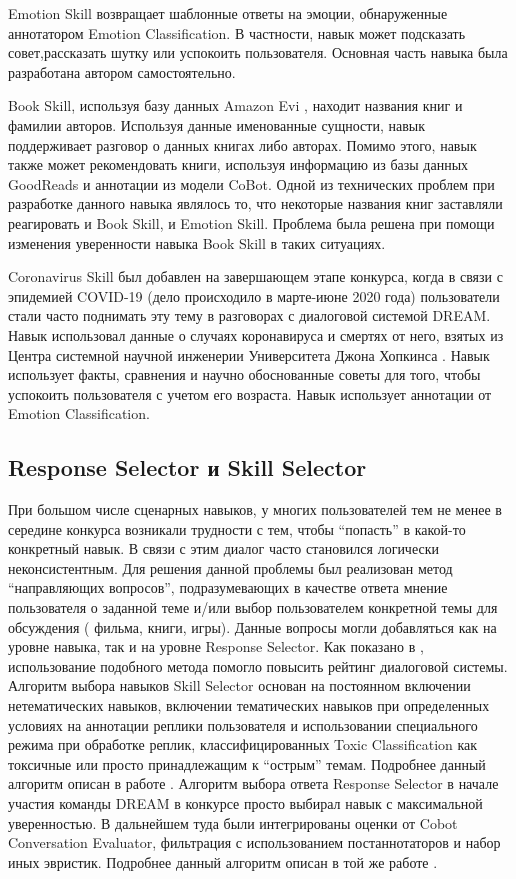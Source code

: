 Emotion Skill возвращает шаблонные ответы на эмоции, обнаруженные аннотатором Emotion Classification. В частности, навык может подсказать совет,рассказать шутку или успокоить пользователя. Основная часть навыка была разработана автором самостоятельно.

Book Skill, используя базу данных Amazon Evi \cite{na_website_nds}, находит названия книг и фамилии авторов. Используя данные именованные сущности, навык поддерживает разговор о данных книгах либо авторах. Помимо этого, навык также может рекомендовать книги, используя информацию из базы данных GoodReads \cite{na_website_ndt} и аннотации из модели CoBot. Одной из технических проблем при разработке данного навыка являлось то, что некоторые названия книг заставляли реагировать и Book Skill, и Emotion Skill. Проблема была решена при помощи изменения уверенности навыка Book Skill в таких ситуациях.

Coronavirus Skill был добавлен на завершающем этапе конкурса, когда в связи с эпидемией COVID-19 (дело происходило в марте-июне 2020 года) пользователи стали часто поднимать эту тему в разговорах с диалоговой системой DREAM. Навык использовал данные о случаях коронавируса и смертях от него, взятых из Центра системной научной инженерии Университета Джона Хопкинса \cite{na_website_ndr}. Навык использует факты, сравнения и научно обоснованные советы для того, чтобы успокоить пользователя с учетом его возраста. Навык использует аннотации от Emotion Classification.

\subsection{Response Selector и Skill Selector}

При большом числе сценарных навыков, у многих пользователей тем не менее в середине конкурса возникали трудности с тем, чтобы “попасть” в какой-то конкретный навык. В связи с этим диалог часто становился логически неконсистентным. Для решения данной проблемы был реализован метод “направляющих вопросов”, подразумевающих в качестве ответа мнение пользователя о заданной теме и/или выбор пользователем конкретной темы для обсуждения ( фильма, книги, игры). Данные вопросы могли добавляться как на уровне навыка, так и на уровне Response Selector. Как показано в \cite{dream1}, использование подобного метода помогло повысить рейтинг диалоговой системы.
Алгоритм выбора навыков Skill Selector основан на постоянном включении нетематических навыков, включении тематических навыков при определенных условиях на аннотации реплики пользователя и использовании специального режима при обработке реплик, классифицированных Toxic Classification как токсичные или просто принадлежащим к “острым” темам. Подробнее данный алгоритм описан в работе \cite{dilya_thesis}.
Алгоритм выбора ответа Response Selector в начале участия команды DREAM в конкурсе просто выбирал навык с максимальной уверенностью. В дальнейшем туда были интегрированы оценки от Cobot Conversation Evaluator, фильтрация с использованием постаннотаторов и набор иных эвристик. Подробнее данный алгоритм описан в той же работе \cite{dilya_thesis}.
